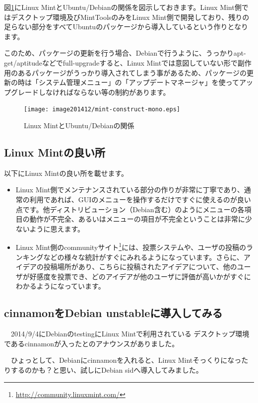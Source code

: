 \documentclass[mingoth,a4paper]{jsarticle}
\begin{document}
 図\ref{fig:mint-construct}にLinux MintとUbuntu/Debianの関係を図示しておきます。Linux Mint側ではデスクトップ環境及びMintToolsのみをLinux Mint側で開発しており、残りの足らない部分をすべてUbuntuのパッケージから導入しているという作りとなります。

 このため、パッケージの更新を行う場合、Debianで行うように、うっかりapt-get/aptitudeなどでfull-upgradeすると、Linux Mintでは意図していない形で副作用のあるパッケージがうっかり導入されてしまう事があるため、パッケージの更新の時は「システム管理メニュー」の「アップデートマネージャ」を使ってアップグレードしなければならない等の制約があります。
\begin{figure}[H]
\centering
\texttt{[image: image201412/mint-construct-mono.eps]}  
\caption{Linux MintとUbuntu/Debianの関係}\label{fig:mint-construct}
\end{figure} 

\subsection{Linux Mintの良い所} 

以下にLinux Mintの良い所を載せます。

\begin{itemize}
 \item Linux Mint側でメンテナンスされている部分の作りが非常に丁寧であり、通常の利用であれば、GUIのメニューを操作するだけですぐに使えるのが良い点です。他ディストリビューション（Debian含む）のようにメニューの各項目の動作が不完全、あるいはメニューの項目が不完全ということは非常に少ないように思えます。
 \item Linux Mint側のcommunityサイト\footnote{\url{http://community.linuxmint.com/}}には、投票システムや、ユーザの投稿のランキングなどの様々な統計がすぐにみれるようになっています。さらに、アイデアの投稿場所があり、こちらに投稿されたアイデアについて、他のユーザが好感度を投票でき、どのアイデアが他のユーザに評価が高いかがすぐにわかるようになっています。
\end{itemize}

\subsection{cinnamonをDebian unstableに導入してみる}

　2014/9/4にDebianのtestingにLinux Mintで利用されている
デスクトップ環境であるcinnamonが入ったとのアナウンスがありました。

　ひょっとして、Debianにcinnamonを入れると、Linux Mintそっくりになったりするのかも？と思い、試しにDebian sidへ導入してみました。
\end{document}
